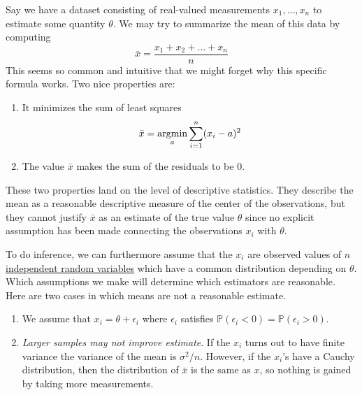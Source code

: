   \begin{example}
    \label{ex:measurement-problem}
    Say we have a dataset consisting of real-valued measurements $x_1, \ldots, x_n$ to estimate some quantity $\theta$. We may try to summarize the mean of this data by computing 
    \begin{equation}
      \bar{x} = \frac{x_1 + x_2 + \ldots + x_n}{n} 
    \end{equation} 
    This seems so common and intuitive that we might forget why this specific formula works. Two nice properties are: 
    \begin{enumerate}
      \item It minimizes the sum of least squares 
      \begin{equation}
        \bar{x} = \operatorname*{\arg\!\min}_{a} \sum_{i=1}^n (x_i - a)^2 
      \end{equation}

      \item The value $\bar{x}$ makes the sum of the residuals to be $0$. 
    \end{enumerate} 
    These two properties land on the level of descriptive statistics. They describe the mean as a reasonable descriptive measure of the center of the observations, but they cannot justify $\bar{x}$ as an estimate of the true value $\theta$ since no explicit assumption has been made connecting the observations $x_i$ with $\theta$. 

    To do inference, we can furthermore assume that the $x_i$ are observed values of $n$ \hyperref[prob-def:independent-random-variables]{independent random variables} which have a common distribution depending on $\theta$. Which assumptions we make will determine which estimators are reasonable. Here are two cases in which means are not a reasonable estimate. 
    \begin{enumerate}
      \item We assume that $x_i = \theta + \epsilon_i$ where $\epsilon_i$ satisfies $\mathbb{P}(\epsilon_i < 0) = \mathbb{P}(\epsilon_i > 0)$. 

      \item \textit{Larger samples may not improve estimate}. If the $x_i$ turns out to have finite variance the variance of the mean is $\sigma^2 /n$. However, if the $x_i$'s have a Cauchy distribution, then the distribution of $\bar{x}$ is the same as $x$, so nothing is gained by taking more measurements. 
    \end{enumerate}
  \end{example}


